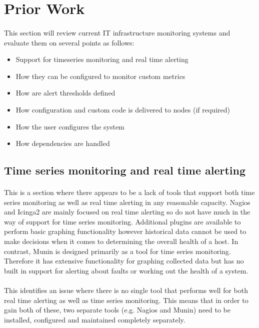 \documentclass[bsc,logo,twoside,singlespacing,notimes]{infthesis}
\begin{document}
\section{Prior Work}
\label{prior-work}
\paragraph*{}
This section will review current IT infrastructure monitoring systems and
evaluate them on several points as follows:
\begin{itemize}
	\item Support for timeseries monitoring and real time alerting
	\item How they can be configured to monitor custom metrics
	\item How are alert thresholds defined
	\item How configuration and custom code is delivered to nodes (if required)
	\item How the user configures the system %
	\item How dependencies are handled
\end{itemize}

\subsection{Time series monitoring and real time alerting}
\paragraph*{}
	This is a section where there appears to be a lack of tools that support both
	time series monitoring as well as real time alerting in any reasonable capacity.
	Nagios and Icinga2 are mainly focused on real time alerting so do not have much
	in the way of support for time series monitoring.  Additional plugins are
	available to perform basic graphing functionality however historical data
	cannot be used to make decisions when it comes to determining the overall
	health of a host. In contrast, Munin is designed primarily as a tool for time
	series monitoring.  Therefore it has extensive functionality for graphing
	collected data but has no built in support for alerting about faults or working
	out the health of a system.
	
\paragraph*{}
	This identifies an issue where there is no single tool that performs well for
	both real time alerting as well as time series monitoring.  This means that
	in order to gain both of these, two separate tools (e.g. Nagios and Munin)
	need to be installed, configured and maintained completely separately.
\end{document}
